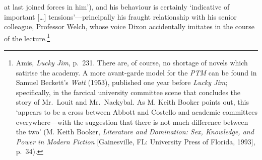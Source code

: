 \documentclass[]{article}
\begin{document}
at last joined forces in him'), and his behaviour is certainly
`indicative of important {[}\ldots{}{]} tensions'---principally his
fraught relationship with his senior colleague, Professor Welch, whose
voice Dixon accidentally imitates in the course of the
lecture.\footnote{Amis, \emph{Lucky Jim}, p.~231. There are, of course,
  no shortage of novels which satirise the academy. A more avant-garde
  model for the \emph{PTM} can be found in Samuel Beckett's \emph{Watt}
  (1953), published one year before \emph{Lucky Jim}; specifically, in
  the farcical university committee scene that concludes the story of
  Mr.~Louit and Mr.~Nackybal. As M. Keith Booker points out, this
  `appears to be a cross between Abbott and Costello and academic
  committees everywhere---with the suggestion that there is not much
  difference between the two' (M. Keith Booker, \emph{Literature and
  Domination: Sex, Knowledge, and Power in Modern Fiction}
  {[}Gainesville, FL: University Press of Florida, 1993{]}, p.~34).}
\end{document}

